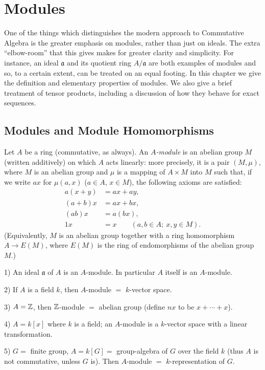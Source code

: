 \chapter{Modules}\label{chapter2}

One of the things which distinguishes the modern approach to Commutative Algebra is the greater emphasis on modules, rather than just on ideals. The extra ``elbow-room'' that this gives makes for greater clarity and simplicity. For instance, an ideal $\mathfrak{a}$ and its quotient ring $A/\mathfrak{a}$ are both examples of modules and so, to a certain extent, can be treated on an equal footing. In this chapter we give the definition and elementary properties of modules. We also give a brief treatment of tensor products, including a discussion of how they behave for exact sequences.

\section*{Modules and Module Homomorphisms}

Let $A$ be a ring (commutative, as always). An \emph{$A$-module} is an abelian group $M$ (written additively) on which $A$ acts linearly: more precisely, it is a pair $(M,\mu)$, where $M$ is an abelian group and $\mu$ is a mapping of $A \times M$ into $M$ such that, if we write $ax$ for $\mu(a, x)$ ($a \in A$, $x \in M$), the following axioms are satisfied:
\begin{align*}
    a(x + y) &= ax + ay, \\
    (a + b)x &= ax + bx, \\
    (ab)x &= a(bx), \\
    1x &= x \qquad (a, b \in A;\ x, y \in M).
\end{align*}
(Equivalently, $M$ is an abelian group together with a ring homomorphism $A\to E(M)$, where $E(M)$ is the ring of endomorphisms of the abelian group $M$.)

\begin{examples}
1) An ideal $\mathfrak{a}$ of $A$ is an $A$-module. In particular $A$ itself is an $A$-module.

2) If $A$ is a field $k$, then $A$-module $=$ $k$-vector space.

3) $A = \mathbb{Z}$, then $\mathbb{Z}$-module $=$ abelian group (define $nx$ to be $x + \cdots + x$).

4) $A = k[x]$ where $k$ is a field; an $A$-module is a $k$-vector space with a linear transformation.

5) $G =$ finite group, $A = k[G] =$ group-algebra of $G$ over the field $k$ (thus $A$ is not commutative, unless $G$ is). Then $A$-module $=$ $k$-representation of $G$.
\end{examples}


